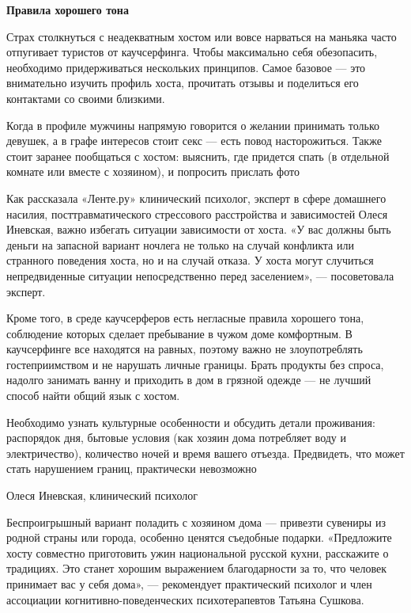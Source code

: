 \textbf{Правила хорошего тона}

Страх столкнуться с неадекватным хостом или вовсе нарваться на маньяка часто отпугивает туристов от каучсерфинга. Чтобы максимально себя обезопасить, необходимо придерживаться нескольких принципов. Самое базовое — это внимательно изучить профиль хоста, прочитать отзывы и поделиться его контактами со своими близкими.

\begin{center}
    \Large
    Когда в профиле мужчины напрямую говорится о желании принимать только девушек, а в графе интересов стоит секс — есть повод насторожиться. Также стоит заранее пообщаться с хостом: выяснить, где придется спать (в отдельной комнате или вместе с хозяином), и попросить прислать фото
\end{center}

Как рассказала «Ленте.ру» клинический психолог, эксперт в сфере домашнего насилия, посттравматического стрессового расстройства и зависимостей Олеся Иневская, важно избегать ситуации зависимости от хоста. «У вас должны быть деньги на запасной вариант ночлега не только на случай конфликта или странного поведения хоста, но и на случай отказа. У хоста могут случиться непредвиденные ситуации непосредственно перед заселением», — посоветовала эксперт.

Кроме того, в среде каучсерферов есть негласные правила хорошего тона, соблюдение которых сделает пребывание в чужом доме комфортным. В каучсерфинге все находятся на равных, поэтому важно не злоупотреблять гостеприимством и не нарушать личные границы. Брать продукты без спроса, надолго занимать ванну и приходить в дом в грязной одежде — не лучший способ найти общий язык с хостом.

\begin{fancyquotes}
    Необходимо узнать культурные особенности и обсудить детали проживания: распорядок дня, бытовые условия (как хозяин дома потребляет воду и электричество), количество ночей и время вашего отъезда. Предвидеть, что может стать нарушением границ, практически невозможно

    \begin{flushright}
        Олеся Иневская, клинический психолог
    \end{flushright}
\end{fancyquotes}

Беспроигрышный вариант поладить с хозяином дома — привезти сувениры из родной страны или города, особенно ценятся съедобные подарки. «Предложите хосту совместно приготовить ужин национальной русской кухни, расскажите о традициях. Это станет хорошим выражением благодарности за то, что человек принимает вас у себя дома», — рекомендует практический психолог и член ассоциации когнитивно-поведенческих психотерапевтов Татьяна Сушкова.

